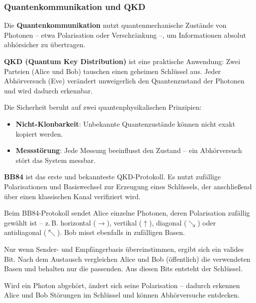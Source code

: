 \subsubsection{Quantenkommunikation und QKD}

Die \textbf{Quantenkommunikation} nutzt quantenmechanische Zustände von Photonen – etwa Polarisation oder Verschränkung –, um Informationen absolut abhörsicher zu übertragen.

\textbf{QKD (Quantum Key Distribution)} ist eine praktische Anwendung: Zwei Parteien (Alice und Bob) tauschen einen geheimen Schlüssel aus. Jeder Abhörversuch (Eve) verändert unweigerlich den Quantenzustand der Photonen und wird dadurch erkennbar.
\vspace{1em}
\begin{tcolorbox}[didaktikbox, title=Was macht QKD sicher?] 
	\label{box:qkd}
	\small
	Die Sicherheit beruht auf zwei quantenphysikalischen Prinzipien:
	\begin{itemize}
		\item \textbf{Nicht-Klonbarkeit}: Unbekannte Quantenzustände können nicht exakt kopiert werden.
		\item \textbf{Messstörung}: Jede Messung beeinflusst den Zustand – ein Abhörversuch stört das System messbar.
	\end{itemize}
\end{tcolorbox}

\textbf{BB84} ist das erste und bekannteste QKD-Protokoll. Es nutzt zufällige Polarisationen und Basiswechsel zur Erzeugung eines Schlüssels, der anschließend über einen klassischen Kanal verifiziert wird.

\vspace{1em}
\begin{tcolorbox}[didaktikbox, title=Wie funktioniert QKD (z.\,B. BB84)?] 
	\label{box:wie funktioniert QKD}
	\small
	Beim BB84-Protokoll sendet Alice einzelne Photonen, deren Polarisation zufällig gewählt ist – z.\,B. horizontal ($\rightarrow$), vertikal ($\uparrow$), diagonal ($\searrow$) oder antidiagonal ($\nwarrow$). Bob misst ebenfalls in zufälligen Basen.
	
	Nur wenn Sender- und Empfängerbasis übereinstimmen, ergibt sich ein valides Bit. Nach dem Austausch vergleichen Alice und Bob (öffentlich) die verwendeten Basen und behalten nur die passenden. Aus diesen Bits entsteht der Schlüssel.
	
	Wird ein Photon abgehört, ändert sich seine Polarisation – dadurch erkennen Alice und Bob Störungen im Schlüssel und können Abhörversuche entdecken.
\end{tcolorbox}


